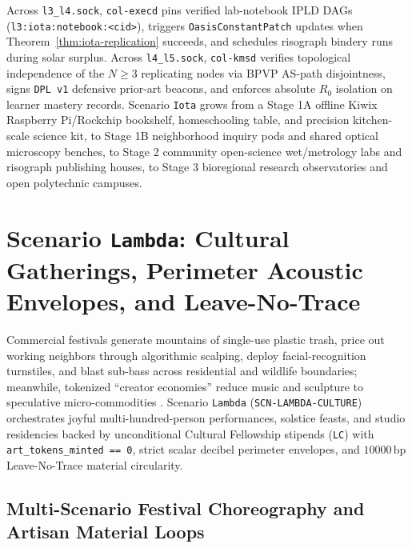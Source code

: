 Across \texttt{l3\_l4.sock}, \texttt{col-execd} pins verified lab-notebook IPLD DAGs
(\texttt{l3:iota:notebook:<cid>}), triggers \texttt{OasisConstantPatch} updates when Theorem~\ref{thm:iota-replication}
succeeds, and schedules risograph bindery runs during solar surplus. Across \texttt{l4\_l5.sock},
\texttt{col-kmsd} verifies topological independence of the $N \ge 3$ replicating nodes via BPVP AS-path
disjointness, signs \texttt{DPL v1} defensive prior-art beacons, and enforces absolute $R_0$ isolation on
learner mastery records. Scenario \texttt{Iota} grows from a Stage 1A offline Kiwix Raspberry Pi/Rockchip
bookshelf, homeschooling table, and precision kitchen-scale science kit, to Stage 1B neighborhood inquiry
pods and shared optical microscopy benches, to Stage 2 community open-science wet/metrology labs and
risograph publishing houses, to Stage 3 bioregional research observatories and open polytechnic campuses.

\section{Scenario \texttt{Lambda}: Cultural Gatherings, Perimeter Acoustic Envelopes, and Leave-No-Trace}
\label{sec:scn-lambda}

Commercial festivals generate mountains of single-use plastic trash, price out working neighbors through
algorithmic scalping, deploy facial-recognition turnstiles, and blast sub-bass across residential and
wildlife boundaries; meanwhile, tokenized ``creator economies'' reduce music and sculpture to speculative
micro-commodities \parencite{han2015,zuboff2019}. Scenario \texttt{Lambda} (\texttt{SCN-LAMBDA-CULTURE})
orchestrates joyful multi-hundred-person performances, solstice feasts, and studio residencies backed by
unconditional Cultural Fellowship stipends (\texttt{LC}) with \texttt{art\_tokens\_minted == 0}, strict
scalar decibel perimeter envelopes, and $10000\,\mathrm{bp}$ Leave-No-Trace material circularity.

\subsection{Multi-Scenario Festival Choreography and Artisan Material Loops}

